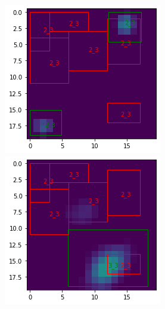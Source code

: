 \documentclass[a4paper,10pt]{report}
\begin{document}
\begin{figure}[!htb]
    \includegraphics[width=\linewidth]{b44_8769_16616_17279_20.png}
  \endminipage\hfill
    \includegraphics[width=\linewidth]{b44_14003_16486_17609_20.png}
  \endminipage\hfill

\end{figure}
\end{document}
